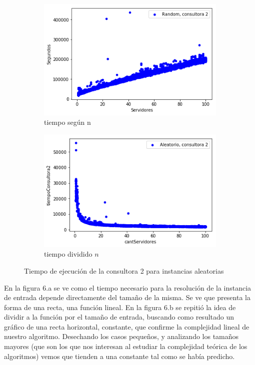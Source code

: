 \documentclass[A4paper,oneside,fleqn,11pt]{article}
\theoremstyle{definition}
\begin{document}
\begin{figure}[H] %
    \begin{subfigure}[b]{0.45\textwidth}
        \includegraphics[width=\textwidth]{graficosEj2/r2}
        \caption[center]{tiempo según n}
        \label{ni se pa que sirve esto}
    \end{subfigure}
    \begin{subfigure}[b]{0.45\textwidth}
        \includegraphics[width=\textwidth]{graficosEj2/complejidad2}
        \caption{tiempo dividido $n$}
        \label{ni se pa que sirve esto}
    \end{subfigure}
    \caption{Tiempo de ejecución de la consultora 2 para instancias aleatorias}
\end{figure}

En la figura 6.a se ve como el tiempo necesario para la resolución de la instancia de entrada depende directamente del tamaño de la misma. Se ve que presenta la forma de una recta, una función lineal. En la figura 6.b se repitió la idea de dividir a la función por el tamaño de entrada, buscando como resultado un gráfico de una recta horizontal, constante, que confirme la complejidad lineal de nuestro algoritmo. Desechando los casos pequeños, y analizando los tamaños mayores (que son los que nos interesan al estudiar la complejidad teórica de los algoritmos) vemos que tienden a una constante tal como se había predicho.
\end{document}
